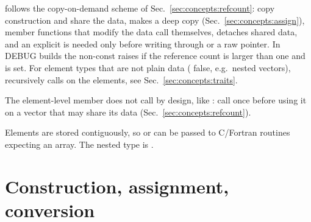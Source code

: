  follows the copy-on-demand scheme of Sec.~\ref{sec:concepts:refcount}: copy construction and  share
the data,  makes a deep copy (Sec.~\ref{sec:concepts:assign}), member functions that modify the data call
 themselves,  detaches shared data, and an explicit  is needed only before
writing through  or a raw pointer. In DEBUG builds the non-const  raises  if the
reference count is larger than one and  is set. For element types that are not plain data
( false, e.g.\ nested vectors),  recursively calls 
on the elements, see Sec.~\ref{sec:concepts:traits}.

The element-level member  does not call  by design, like : call
 once before using it on a vector that may share its data (Sec.~\ref{sec:concepts:refcount}).

Elements are stored contiguously, so  or  can be passed to C/Fortran routines expecting an array.
The nested type  is .

\section{Construction, assignment, conversion}\label{sec:vec:construct}

